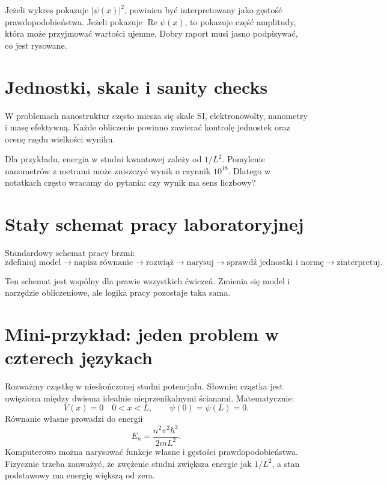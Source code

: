 Jeżeli wykres pokazuje \(|\psi(x)|^2\), powinien być interpretowany jako gęstość
prawdopodobieństwa. Jeżeli pokazuje \(\operatorname{Re}\psi(x)\), to pokazuje
część amplitudy, która może przyjmować wartości ujemne. Dobry raport musi jasno
podpisywać, co jest rysowane.

\section{Jednostki, skale i sanity checks}

W problemach nanostruktur często miesza się skale SI, elektronowolty, nanometry
i masę efektywną. Każde obliczenie powinno zawierać kontrolę jednostek oraz ocenę
rzędu wielkości wyniku.

Dla przykładu, energia w studni kwantowej zależy od \(1/L^2\). Pomylenie
nanometrów z metrami może zniszczyć wynik o czynnik \(10^{18}\). Dlatego w
notatkach często wracamy do pytania: czy wynik ma sens liczbowy?

\section{Stały schemat pracy laboratoryjnej}

\begin{summarybox}
Standardowy schemat pracy brzmi:
\[
\text{zdefiniuj model}
\rightarrow
\text{napisz równanie}
\rightarrow
\text{rozwiąż}
\rightarrow
\text{narysuj}
\rightarrow
\text{sprawdź jednostki i normę}
\rightarrow
\text{zinterpretuj}.
\]
\end{summarybox}

Ten schemat jest wspólny dla prawie wszystkich ćwiczeń. Zmienia się model i
narzędzie obliczeniowe, ale logika pracy pozostaje taka sama.

\section{Mini-przykład: jeden problem w czterech językach}

Rozważmy cząstkę w nieskończonej studni potencjału. Słownie: cząstka jest
uwięziona między dwiema idealnie nieprzenikalnymi ścianami. Matematycznie:
\begin{equation}
    V(x)=0\quad 0<x<L,
    \qquad
    \psi(0)=\psi(L)=0.
\end{equation}
Równanie własne prowadzi do energii
\begin{equation}
    E_n=\frac{n^2\pi^2\hbar^2}{2mL^2}.
\end{equation}
Komputerowo można narysować funkcje własne i gęstości prawdopodobieństwa.
Fizycznie trzeba zauważyć, że zwężenie studni zwiększa energie jak \(1/L^2\), a
stan podstawowy ma energię większą od zera.

